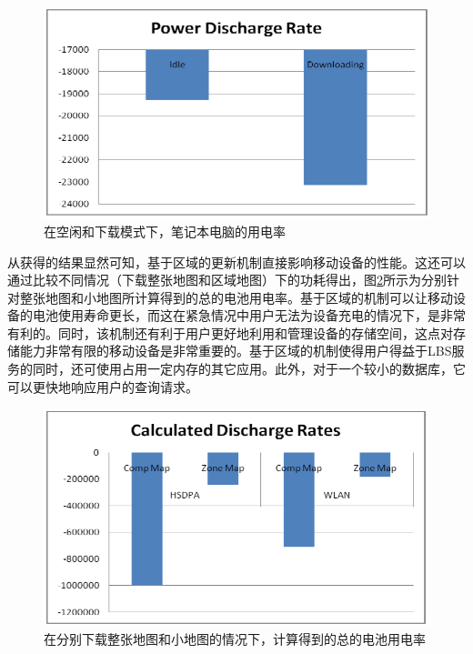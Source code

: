 \documentclass{article}
\begin{document}
\begin{CJK}{UTF8}{gbsn}
	\begin{figure}[htbp]
		\centering
		\includegraphics[bb=0 0 741 406, scale=0.45]{figure/fig09.png}
		\caption{在空闲和下载模式下，笔记本电脑的用电率}
		\label{fig:the-laptop-battery-discharge-rate}
	\end{figure}

	从获得的结果显然可知，基于区域的更新机制直接影响移动设备的性能。这还可以通过比较不同情况（下载整张地图和区域地图）下的功耗得出，图\ref{fig:the-calculated-total-battery-discharge-rate}所示为分别针对整张地图和小地图所计算得到的总的电池用电率。基于区域的机制可以让移动设备的电池使用寿命更长，而这在紧急情况中用户无法为设备充电的情况下，是非常有利的。同时，该机制还有利于用户更好地利用和管理设备的存储空间，这点对存储能力非常有限的移动设备是非常重要的。基于区域的机制使得用户得益于LBS服务的同时，还可使用占用一定内存的其它应用。此外，对于一个较小的数据库，它可以更快地响应用户的查询请求。

	\begin{figure}[htbp]
		\centering
		\includegraphics[bb=0 0 744 419, scale=0.45]{figure/fig10.png}
		\caption{在分别下载整张地图和小地图的情况下，计算得到的总的电池用电率}
		\label{fig:the-calculated-total-battery-discharge-rate}
	\end{figure}



\end{CJK}
\end{document}
